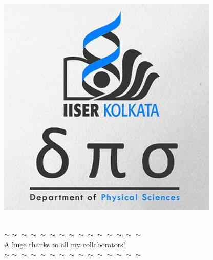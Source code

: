 \documentclass[10pt,aspectratio=169]{beamer}
\begin{document}
\begin{frame}{}
\begin{minipage}{0.1\textwidth}
	\includegraphics[width=\textwidth]{dps_logo.jpeg}
\end{minipage}
\hspace*{\fill}
\\
\vspace*{\fill}
\alert{$\sim\sim\sim\sim\sim\sim\sim\sim\sim\sim\sim\sim\sim\sim\sim$ }\\
\alert{A huge thanks to all my collaborators! }\\
\alert{$\sim\sim\sim\sim\sim\sim\sim\sim\sim\sim\sim\sim\sim\sim\sim$ }\\
\vspace*{\fill}


\end{frame}
\end{document}
